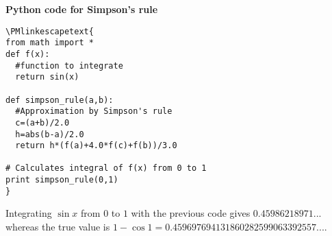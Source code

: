 \documentclass[12pt]{article}
\begin{document}
\textbf{Python code for Simpson's rule}

\begin{verbatim}
\PMlinkescapetext{
from math import *
def f(x):
  #function to integrate
  return sin(x)

def simpson_rule(a,b):
  #Approximation by Simpson's rule
  c=(a+b)/2.0
  h=abs(b-a)/2.0
  return h*(f(a)+4.0*f(c)+f(b))/3.0

# Calculates integral of f(x) from 0 to 1
print simpson_rule(0,1)
}
\end{verbatim}

Integrating $\sin x$ from $0$ to $1$ with the previous code gives $0.45986218971...$ whereas the true value is $1-\cos 1 = 0.459697694131860282599063392557...$.
\end{document}
